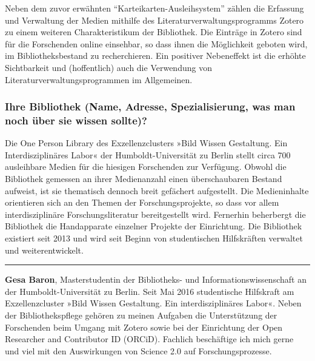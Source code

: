 Neben dem zuvor erwähnten \enquote{Karteikarten-Ausleihsystem} zählen
die Erfassung und Verwaltung der Medien mithilfe des
Literaturverwaltungsprogramms Zotero zu einem weiteren Charakteristikum
der Bibliothek. Die Einträge in Zotero sind für die Forschenden online
einsehbar, so dass ihnen die Möglichkeit geboten wird, im
Bibliotheksbestand zu recherchieren. Ein positiver Nebeneffekt ist die
erhöhte Sichtbarkeit und (hoffentlich) auch die Verwendung von
Literaturverwaltungsprogrammen im Allgemeinen.

\hypertarget{ihre-bibliothek-name-adresse-spezialisierung-was-man-noch-uxfcber-sie-wissen-sollte}{%
\subsubsection{Ihre Bibliothek (Name, Adresse, Spezialisierung, was man noch
über sie wissen
sollte)?}\label{ihre-bibliothek-name-adresse-spezialisierung-was-man-noch-uxfcber-sie-wissen-sollte}}

Die One Person Library des Exzellenzclusters »Bild Wissen Gestaltung.
Ein Interdisziplinäres Labor« der Humboldt-Universität zu Berlin stellt
circa 700 ausleihbare Medien für die hiesigen Forschenden zur Verfügung.
Obwohl die Bibliothek gemessen an ihrer Medienanzahl einen
überschaubaren Bestand aufweist, ist sie thematisch dennoch breit
gefächert aufgestellt. Die Medieninhalte orientieren sich an den Themen
der Forschungsprojekte, so dass vor allem interdisziplinäre
Forschungsliteratur bereitgestellt wird. Fernerhin beherbergt die
Bibliothek die Handapparate einzelner Projekte der Einrichtung. Die
Bibliothek existiert seit 2013 und wird seit Beginn von studentischen
Hilfskräften verwaltet und weiterentwickelt.

\begin{center}\rule{0.5\linewidth}{\linethickness}\end{center}

\textbf{Gesa Baron}, Masterstudentin der Bibliotheks- und
Informationswissenschaft an der Humboldt-Universität zu Berlin. Seit Mai
2016 studentische Hilfskraft am Exzellenzcluster »Bild Wissen
Gestaltung. Ein interdisziplinäres Labor«. Neben der Bibliothekspflege
gehören zu meinen Aufgaben die Unterstützung der Forschenden beim Umgang
mit Zotero sowie bei der Einrichtung der Open Researcher and Contributor
ID (ORCiD). Fachlich beschäftige ich mich gerne und viel mit den
Auswirkungen von Science 2.0 auf Forschungsprozesse.
